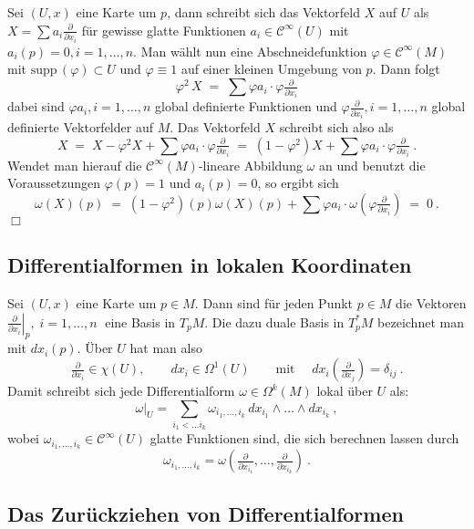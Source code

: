 \documentclass[12pt,a4paper]{article}
\def\supp{\mathrm{supp}\,}
\def\qed{\quad\hfill\ensuremath{\Box}}
\begin{document}
Sei $(U,x)$ eine Karte um $p$, dann schreibt sich das Vektorfeld $X$ auf $U$ als
$
X = \sum a_i \frac{\partial}{\partial x_i}
$
f\"ur gewisse glatte Funktionen $a_i \in \mathcal C^\infty(U)$ mit $a_i(p)=0, i=1, \ldots, n$. Man w\"ahlt
nun eine Abschneidefunktion $\varphi \in \mathcal C^\infty(M)$ mit $\supp (\varphi ) \subset U$ und
$\varphi \equiv 1$ auf einer kleinen Umgebung von $p$. Dann folgt
$$
\varphi^2\, X \;=\; \sum \varphi a_i \cdot \varphi \tfrac{\partial}{\partial x_i}
$$
dabei sind $ \varphi a_i, i = 1, \ldots, n$ global definierte Funktionen und $ \varphi \tfrac{\partial}{\partial x_i},
i = 1, \ldots, n$ global definierte Vektorfelder auf $M$. Das Vektorfeld $X$ schreibt sich also als
$$
X \;=\; X - \varphi^2 X + \sum \varphi a_i \cdot \varphi \tfrac{\partial}{\partial x_i}
\;=\; (1 - \varphi^2) X +  \sum \varphi a_i \cdot \varphi \tfrac{\partial}{\partial x_i} \ .
$$
Wendet man hierauf die $\mathcal C^\infty(M)$-lineare Abbildung $\omega$ an und benutzt die
Voraussetzungen $\varphi(p) = 1$ und $a_i(p)=0$, so ergibt sich
$$
\omega(X)(p) \;=\; (1-\varphi^2)(p) \omega(X)(p) + \sum \varphi a_i \cdot \omega(\varphi \tfrac{\partial}{\partial x_i}) \;=\; 0 \ .
$$
\qed

\bigskip

\subsection{Differentialformen in lokalen Koordinaten}

Sei $(U,x)$ eine Karte um $p \in M$. Dann sind f\"ur jeden Punkt $p\in M$ die Vektoren
$
\left. \tfrac{\partial}{\partial x_i} \right|_{p}, \; i = 1, \ldots, n \;
$
eine Basis in $T_pM$. Die dazu duale Basis in $T^*_pM$ bezeichnet man mit $dx_i(p)$. \"Uber $U$
hat man also
$$
\tfrac{\partial}{\partial x_i} \in \chi(U),\qquad dx_i \in \Omega^1(U) \qquad \mbox{mit }
\quad dx_i (\tfrac{\partial}{\partial x_j}) = \delta_{ij} \ .
$$
Damit schreibt sich jede Differentialform $\omega \in \Omega^k(M)$ lokal \"uber $U$ als:
$$
\left. \omega \right|_U = \sum_{i_1 < \ldots i_k} \omega_{i_1, \ldots, i_k} \, dx_{i_1} \wedge \ldots \wedge dx_{i_k} \ ,
$$
wobei $\omega_{i_1, \ldots, i_k} \in \mathcal C^\infty(U)$ glatte Funktionen sind, die sich berechnen lassen
durch
$$
\omega_{i_1, \ldots, i_k} = \omega(\tfrac{\partial}{\partial x_{i_1}}, \ldots, \tfrac{\partial}{\partial x_{i_k}}) \ .
$$


\bigskip

\subsection{Das Zur\"uckziehen von Differentialformen}
\end{document}
